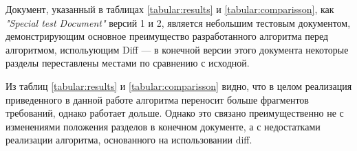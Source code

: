 Документ, указанный в таблицах \ref{tabular:results} и \ref{tabular:comparisson}, как \emph{"Special test Document"} версий 1 и 2, является небольшим тестовым документом, демонстрирующим основное преимущество разработанного алгоритма перед алгоритмом, испольующим Diff --- в конечной версии этого документа некоторые разделы переставлены местами по сравнению с исходной.

Из таблиц \ref{tabular:results} и \ref{tabular:comparisson} видно, что в целом реализация приведенного в данной работе алгоритма переносит больше фрагментов требований, однако работает дольше. Однако это связано преимущественно не с изменениями положения разделов в конечном документе, а с недостатками реализации алгоритма, основанного на использовании diff.
